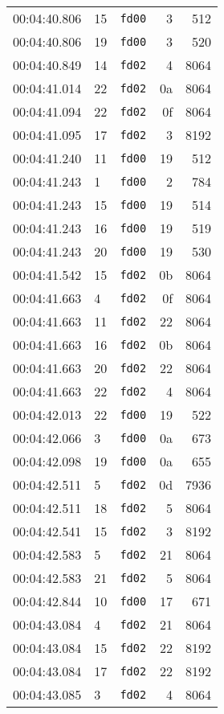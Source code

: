 \documentclass{article}
\begin{document}
\begin{longtable}{lllrr}
00:04:40.806 & 15 & \texttt{fd00} & 3 & 512 \\
00:04:40.806 & 19 & \texttt{fd00} & 3 & 520 \\
00:04:40.849 & 14 & \texttt{fd02} & 4 & 8064 \\
00:04:41.014 & 22 & \texttt{fd02} & 0a & 8064 \\
00:04:41.094 & 22 & \texttt{fd02} & 0f & 8064 \\
00:04:41.095 & 17 & \texttt{fd02} & 3 & 8192 \\
00:04:41.240 & 11 & \texttt{fd00} & 19 & 512 \\
00:04:41.243 & 1 & \texttt{fd00} & 2 & 784 \\
00:04:41.243 & 15 & \texttt{fd00} & 19 & 514 \\
00:04:41.243 & 16 & \texttt{fd00} & 19 & 519 \\
00:04:41.243 & 20 & \texttt{fd00} & 19 & 530 \\
00:04:41.542 & 15 & \texttt{fd02} & 0b & 8064 \\
00:04:41.663 & 4 & \texttt{fd02} & 0f & 8064 \\
00:04:41.663 & 11 & \texttt{fd02} & 22 & 8064 \\
00:04:41.663 & 16 & \texttt{fd02} & 0b & 8064 \\
00:04:41.663 & 20 & \texttt{fd02} & 22 & 8064 \\
00:04:41.663 & 22 & \texttt{fd02} & 4 & 8064 \\
00:04:42.013 & 22 & \texttt{fd00} & 19 & 522 \\
00:04:42.066 & 3 & \texttt{fd00} & 0a & 673 \\
00:04:42.098 & 19 & \texttt{fd00} & 0a & 655 \\
00:04:42.511 & 5 & \texttt{fd02} & 0d & 7936 \\
00:04:42.511 & 18 & \texttt{fd02} & 5 & 8064 \\
00:04:42.541 & 15 & \texttt{fd02} & 3 & 8192 \\
00:04:42.583 & 5 & \texttt{fd02} & 21 & 8064 \\
00:04:42.583 & 21 & \texttt{fd02} & 5 & 8064 \\
00:04:42.844 & 10 & \texttt{fd00} & 17 & 671 \\
00:04:43.084 & 4 & \texttt{fd02} & 21 & 8064 \\
00:04:43.084 & 15 & \texttt{fd02} & 22 & 8192 \\
00:04:43.084 & 17 & \texttt{fd02} & 22 & 8192 \\
00:04:43.085 & 3 & \texttt{fd02} & 4 & 8064 \\

\end{longtable}
\end{document}
